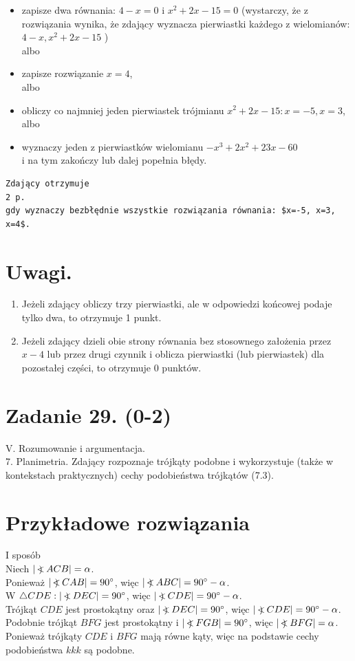 \documentclass[10pt]{article}
\newcommand\Varangle{\mathop{{<\!\!\!\!\!\text{\small)}}\:}\nolimits}
\begin{document}
\begin{itemize}
  \item zapisze dwa równania: $4-x=0$ i $x^{2}+2 x-15=0$ (wystarczy, że z rozwiązania wynika, że zdający wyznacza pierwiastki każdego z wielomianów: $4-x, x^{2}+2 x-15$ )\\
albo
  \item zapisze rozwiązanie $x=4$,\\
albo
  \item obliczy co najmniej jeden pierwiastek trójmianu $x^{2}+2 x-15: x=-5, x=3$,\\
albo
  \item wyznaczy jeden z pierwiastków wielomianu $-x^{3}+2 x^{2}+23 x-60$\\
i na tym zakończy lub dalej popełnia błędy.
\end{itemize}

\begin{verbatim}
Zdający otrzymuje
2 p.
gdy wyznaczy bezbłędnie wszystkie rozwiązania równania: $x=-5, x=3, x=4$.
\end{verbatim}

\section*{Uwagi.}
\begin{enumerate}
  \item Jeżeli zdający obliczy trzy pierwiastki, ale w odpowiedzi końcowej podaje tylko dwa, to otrzymuje 1 punkt.
  \item Jeżeli zdający dzieli obie strony równania bez stosownego założenia przez $x-4$ lub przez drugi czynnik i oblicza pierwiastki (lub pierwiastek) dla pozostałej części, to otrzymuje 0 punktów.
\end{enumerate}

\section*{Zadanie 29. (0-2)}
V. Rozumowanie i argumentacja.\\
7. Planimetria. Zdający rozpoznaje trójkąty podobne i wykorzystuje (także w kontekstach praktycznych) cechy podobieństwa trójkątów (7.3).

\section*{Przykładowe rozwiązania}
I sposób\\
Niech $|\Varangle A C B|=\alpha$.\\
Ponieważ $|\Varangle C A B|=90^{\circ}$, więc $|\Varangle A B C|=90^{\circ}-\alpha$.\\
W $\triangle C D E:|\Varangle D E C|=90^{\circ}$, więc $|\Varangle C D E|=90^{\circ}-\alpha$.\\
Trójkąt $C D E$ jest prostokątny oraz $|\Varangle D E C|=90^{\circ}$, więc $|\Varangle C D E|=90^{\circ}-\alpha$.\\
Podobnie trójkąt $B F G$ jest prostokątny i $|\Varangle F G B|=90^{\circ}$, więc $|\Varangle B F G|=\alpha$.\\
Ponieważ trójkąty $C D E$ i $B F G$ mają równe kąty, więc na podstawie cechy podobieństwa $k k k$ są podobne.
\end{document}
